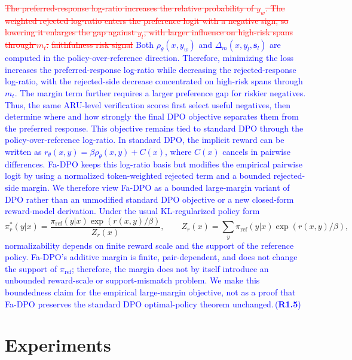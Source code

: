 \documentclass[a4paper,fleqn,doubleblind]{cas-sc}
\DeclareRobustCommand{\deleted}[1]{\textcolor{red}{\sout{#1}}}
\DeclareRobustCommand{\added}[1]{\textcolor{blue}{#1}}
\DeclareRobustCommand{\revtag}[1]{\textcolor{blue}{\scriptsize\,(\textbf{#1})}}
\begin{document}
\deleted{The preferred-response log-ratio increases the relative probability of $y_w$. The weighted rejected log-ratio enters the preference logit with a negative sign, so lowering it enlarges the gap against $y_l$, with larger influence on high-risk spans through $m_t$.}
\deleted{faithfulness risk signal}
\added{Both $\rho_\theta(x,y_w)$ and $\Delta_m(x,y_l,\mathbf{s}_l)$ are computed in the policy-over-reference direction. Therefore, minimizing the loss increases the preferred-response log-ratio while decreasing the rejected-response log-ratio, with the rejected-side decrease concentrated on high-risk spans through $m_t$. The margin term further requires a larger preference gap for riskier negatives. Thus, the same ARU-level verification scores first select useful negatives, then determine where and how strongly the final DPO objective separates them from the preferred response.}
\added{This objective remains tied to standard DPO through the policy-over-reference log-ratio. In standard DPO, the implicit reward can be written as $r_\theta(x,y)=\beta\rho_\theta(x,y)+C(x)$, where $C(x)$ cancels in pairwise differences. Fa-DPO keeps this log-ratio basis but modifies the empirical pairwise logit by using a normalized token-weighted rejected term and a bounded rejected-side margin. We therefore view Fa-DPO as a bounded large-margin variant of DPO rather than an unmodified standard DPO objective or a new closed-form reward-model derivation. Under the usual KL-regularized policy form}
\begingroup
\color{blue}
\[
\pi_r^*(y|x)=
\frac{\pi_{\mathrm{ref}}(y|x)\exp(r(x,y)/\beta)}
{Z_r(x)},
\qquad
Z_r(x)=\sum_y \pi_{\mathrm{ref}}(y|x)\exp(r(x,y)/\beta),
\]
\endgroup
\added{normalizability depends on finite reward scale and the support of the reference policy. Fa-DPO's additive margin is finite, pair-dependent, and does not change the support of $\pi_{\mathrm{ref}}$; therefore, the margin does not by itself introduce an unbounded reward-scale or support-mismatch problem. We make this boundedness claim for the empirical large-margin objective, not as a proof that Fa-DPO preserves the standard DPO optimal-policy theorem unchanged.}\revtag{R1.5}

\section{Experiments}
\label{sec:experiments}
\end{document}
